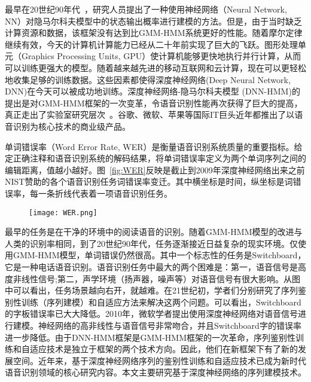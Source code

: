 最早在20世纪90年代~\cite{bourlard1989continuous,bourlard1992cdnn,bourlard2012connectionist}，研究人员提出了一种使用神经网络（Neural Network, NN）对隐马尔科夫模型中的状态输出概率进行建模的方法。但是，由于当时缺乏计算资源和数据，该框架没有达到比GMM-HMM系统更好的性能。随着摩尔定律继续有效，今天的计算机计算能力已经从二十年前实现了巨大的飞跃。图形处理单元（Graphics Processing Units, GPU）使计算机能够更快地执行并行计算，从而可以训练更强大的模型。随着越来越先进的移动互联网和云计算，现在可以更轻松地收集足够的训练数据。这些因素都使得深度神经网络(Deep Neural Network, DNN)在今天可以被成功地训练。深度神经网络-隐马尔科夫模型 (DNN-HMM)的提出是对GMM-HMM框架的一次变革，令语音识别性能再次获得了巨大的提高，真正走出了实验室研究层次~\cite{ASRBook-Yu2014,CD-DNN-HMM-dahl2012,DNN4ASR-hinton2012,qian2016very,TDNN-peddinti2015,Deepspeech2-amodei2015,LACE-yu2016,xiong2017microsoft}。谷歌、微软、苹果等国际IT巨头近年都推出了以语音识别为核心技术的商业级产品。


单词错误率（Word Error Rate, WER）是衡量语音识别系统质量的重要指标。给定正确注释和语音识别系统的解码结果，将单词错误率定义为两个单词序列之间的编辑距离，值越小越好。图~\ref{fig:WER}反映是截止到2009年深度神经网络出来之前NIST赞助的各个语音识别任务词错误率变迁。其中横坐标是时间，纵坐标是词错误率，每一条折线代表着一项语音识别任务。
\begin{figure}[ht]
  \centering
    \captionstyle{\centering}
    \centering
    \texttt{[image: WER.png]}
\end{figure}

最早的任务是在干净的环境中的阅读语音的识别。随着GMM-HMM模型的改进与人类的识别率相同，到了20世纪90年代，任务逐渐接近日益复杂的现实环境。仅使用GMM-HMM模型，单词错误仍然很高。其中一个标志性的任务是Switchboard，它是一种电话语音识别。语音识别任务中最大的两个困难是：第一，语音信号是高度非线性信号;第二，声学环境（扬声器，噪声等）对语音信号有很大影响。从图中可以看出，任务场景越向右开，就越难。在21世纪初，学者们分别研究了序列鉴别性训练（序列建模）和自适应方法来解决这两个问题。可以看出，Switchboard的字板错误率已大大降低。2010年，微软学者提出使用深度神经网络对语音信号进行建模。神经网络的高非线性与语音信号非常吻合，并且Switchboard字的错误率进一步降低。由于DNN-HMM框架是GMM-HMM框架的一次革命，序列鉴别性训练和自适应技术是独立于框架的两个技术方向。因此，他们在新框架下有了新的发展空间。近年来，基于深度神经网络序列的鉴别性训练和自适应技术已成为新时代语音识别领域的核心研究内容。本文主要研究基于深度神经网络的序列建模技术。

